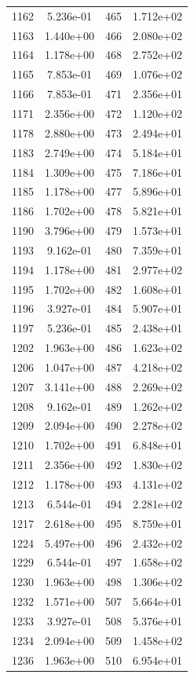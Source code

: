 \documentclass[12pt]{article}
\begin{document}
\begin{longtable}{@{}cccc@{}}
1162 & 5.236e-01 & 465 & 1.712e+02 \\
1163 & 1.440e+00 & 466 & 2.080e+02 \\
1164 & 1.178e+00 & 468 & 2.752e+02 \\
1165 & 7.853e-01 & 469 & 1.076e+02 \\
1166 & 7.853e-01 & 471 & 2.356e+01 \\
1171 & 2.356e+00 & 472 & 1.120e+02 \\
1178 & 2.880e+00 & 473 & 2.494e+01 \\
1183 & 2.749e+00 & 474 & 5.184e+01 \\
1184 & 1.309e+00 & 475 & 7.186e+01 \\
1185 & 1.178e+00 & 477 & 5.896e+01 \\
1186 & 1.702e+00 & 478 & 5.821e+01 \\
1190 & 3.796e+00 & 479 & 1.573e+01 \\
1193 & 9.162e-01 & 480 & 7.359e+01 \\
1194 & 1.178e+00 & 481 & 2.977e+02 \\
1195 & 1.702e+00 & 482 & 1.608e+01 \\
1196 & 3.927e-01 & 484 & 5.907e+01 \\
1197 & 5.236e-01 & 485 & 2.438e+01 \\
1202 & 1.963e+00 & 486 & 1.623e+02 \\
1206 & 1.047e+00 & 487 & 4.218e+02 \\
1207 & 3.141e+00 & 488 & 2.269e+02 \\
1208 & 9.162e-01 & 489 & 1.262e+02 \\
1209 & 2.094e+00 & 490 & 2.278e+02 \\
1210 & 1.702e+00 & 491 & 6.848e+01 \\
1211 & 2.356e+00 & 492 & 1.830e+02 \\
1212 & 1.178e+00 & 493 & 4.131e+02 \\
1213 & 6.544e-01 & 494 & 2.281e+02 \\
1217 & 2.618e+00 & 495 & 8.759e+01 \\
1224 & 5.497e+00 & 496 & 2.432e+02 \\
1229 & 6.544e-01 & 497 & 1.658e+02 \\
1230 & 1.963e+00 & 498 & 1.306e+02 \\
1232 & 1.571e+00 & 507 & 5.664e+01 \\
1233 & 3.927e-01 & 508 & 5.376e+01 \\
1234 & 2.094e+00 & 509 & 1.458e+02 \\
1236 & 1.963e+00 & 510 & 6.954e+01 \\

\end{longtable}
\end{document}
